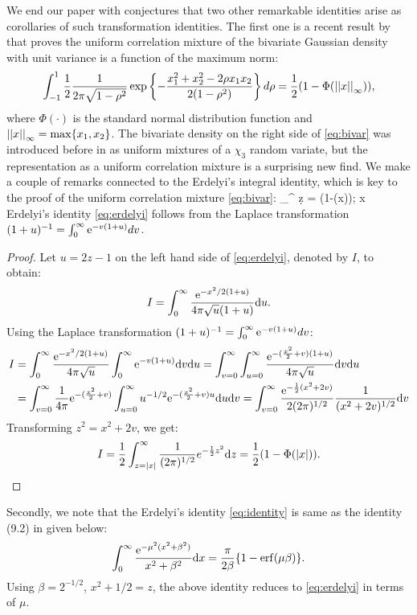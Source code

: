 \documentclass[lineno]{biometrika}
\begin{document}
We end our paper with conjectures that two other remarkable identities arise as corollaries of such transformation identities. The first one is a recent result by \cite{zhang2014uniform} that proves the uniform correlation mixture of the bivariate Gaussian density with unit variance is a function of the maximum norm: 
\begin{equation}
  \int_{-1}^{1} \half \frac{1}{2\pi\sqrt{1-\rho^2}} \exp \left\{ - \frac{x_1^2 + x_2^2 - 2 \rho x_1 x_2}{2(1-\rho^2)} \right\} d \rho = 
  \half (1- \Phi(\vectornorm{x}_{\infty})) \label{eq:bivar}, 
\end{equation}
where $\Phi(\cdot)$ is the standard normal distribution function and $\left|\left|x\right|\right|_{\infty} = \max \{ x_1, x_2\}$. The bivariate density on the right side of \eqref{eq:bivar} was introduced before in \cite{bryson1982constructing} as uniform mixtures of a $\chi_3$ random variate, but the representation as a uniform correlation mixture is a surprising new find. We make a couple of remarks connected to the Erdelyi's integral identity, which is key to the proof of the uniform correlation mixture \eqref{eq:bivar}: 
\beq
\int_{\half}^{\infty}  \d z = \half (1-\Phi(x)); x  \label{eq:erdelyi}
\eeq
Erdelyi's identity \eqref{eq:erdelyi} follows from the Laplace transformation $(1+u)^{-1} = \int_0^{\infty} {\rm e}^{-v(1+u)} dv$. 
\begin{proof}
Let $ u = 2z-1$ on the left hand side of \eqref{eq:erdelyi}, denoted by $I$, to obtain: 
$$
I = \int_{0}^{\infty} \frac{{\rm e}^{-x^2/2(1+u)}}{4 \pi \sqrt{u} (1+u)} {\rm d} u.
$$
Using the Laplace transformation $(1+u)^{-1} = \int_0^{\infty} {\rm e}^{-v(1+u)} dv$: 
\begin{align*}
I & = \int_{0}^{\infty} \frac{{\rm e}^{-x^2/2(1+u)}}{4 \pi \sqrt{u}} \int_0^{\infty} {\rm e}^{-v(1+u)} {\rm d} v {\rm d} u = \int_{v= 0}^{\infty} \int_{u=0}^{\infty} \frac{{\rm e}^{-(\frac{x^2}{2} + v)(1+u)}}{4 \pi \sqrt{u}} {\rm d} v {\rm d} u \\
& = \int_{v= 0}^{\infty} \frac{1}{4\pi} {\rm e}^{-(\frac{x^2}{2} + v)} \int_{u=0}^{\infty} u^{-1/2} {\rm e}^{-(\frac{x^2}{2} + v) u} {\rm d} u {\rm d} v = \int_{v= 0}^{\infty} \frac{ {\rm e}^{-\frac{1}{2}(x^2 + 2v)}}{2 (2\pi)^{1/2}} \frac{1}{(x^2+ 2v)^{1/2}} {\rm d} v\\
\end{align*}
Transforming $z^2 = x^2 + 2v$, we get: 
$$
I =\frac{1}{2}  \int_{z = |x|}^{\infty} \frac{1}{(2\pi)^{1/2}} e^{-\frac{1}{2} z^2} {\rm d} z = \frac{1}{2} (1 - \Phi(|x|)).
$$
\end{proof}
Secondly, we note that the Erdelyi's identity \eqref{eq:identity} is same as the identity (9.2) in \citep{amdeberhan2010cauchy} given below: 
$$
\int_0^{\infty}\frac{{\rm e}^{-\mu^2(x^2+\beta^2)}}{x^2+\beta^2} {\rm d} x = \frac{\pi}{2 \beta} \{ 1 - {\rm erf}(\mu \beta) \}.
$$
Using $\beta = 2^{-1/2}$, $x^2+1/2 = z$, the above identity reduces to \eqref{eq:erdelyi} in terms of $\mu$. 
\end{document}
